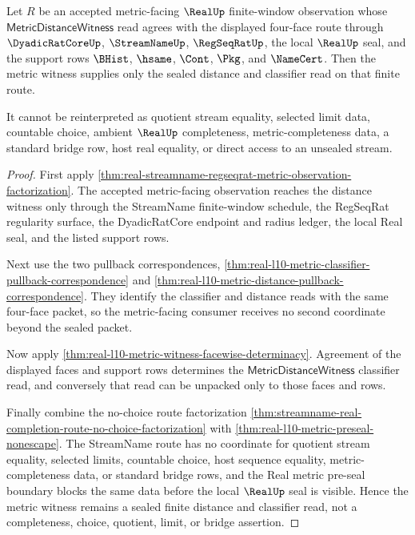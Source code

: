 \begin{theorem}
\label{thm:real-l10-metric-four-face-completeness-refusal}
Let $R$ be an accepted metric-facing $\RealUp$ finite-window observation whose
$\mathsf{MetricDistanceWitness}$ read agrees with the displayed four-face route
through $\DyadicRatCoreUp$, $\StreamNameUp$, $\RegSeqRatUp$, the local
$\RealUp$ seal, and the support rows $\BHist$, $\hsame$, $\Cont$, $\Pkg$, and
$\NameCert$. Then the metric witness supplies only the sealed distance and
classifier read on that finite route.

It cannot be reinterpreted as quotient stream equality, selected limit data,
countable choice, ambient $\RealUp$ completeness, metric-completeness data, a
standard bridge row, host real equality, or direct access to an unsealed stream.
\end{theorem}
\begin{proof}
First apply
\autoref{thm:real-streamname-regseqrat-metric-observation-factorization}. The
accepted metric-facing observation reaches the distance witness only through
the StreamName finite-window schedule, the RegSeqRat regularity surface, the
DyadicRatCore endpoint and radius ledger, the local Real seal, and the listed
support rows.

Next use the two pullback correspondences,
\autoref{thm:real-l10-metric-classifier-pullback-correspondence} and
\autoref{thm:real-l10-metric-distance-pullback-correspondence}. They identify
the classifier and distance reads with the same four-face packet, so the
metric-facing consumer receives no second coordinate beyond the sealed packet.

Now apply
\autoref{thm:real-l10-metric-witness-facewise-determinacy}. Agreement of the
displayed faces and support rows determines the
$\mathsf{MetricDistanceWitness}$ classifier read, and conversely that read can
be unpacked only to those faces and rows.

Finally combine the no-choice route factorization
\autoref{thm:streamname-real-completion-route-no-choice-factorization} with
\autoref{thm:real-l10-metric-preseal-nonescape}. The StreamName route has no
coordinate for quotient stream equality, selected limits, countable choice,
host sequence equality, metric-completeness data, or standard bridge rows, and
the Real metric pre-seal boundary blocks the same data before the local
$\RealUp$ seal is visible. Hence the metric witness remains a sealed finite
distance and classifier read, not a completeness, choice, quotient, limit, or
bridge assertion.
\end{proof}
